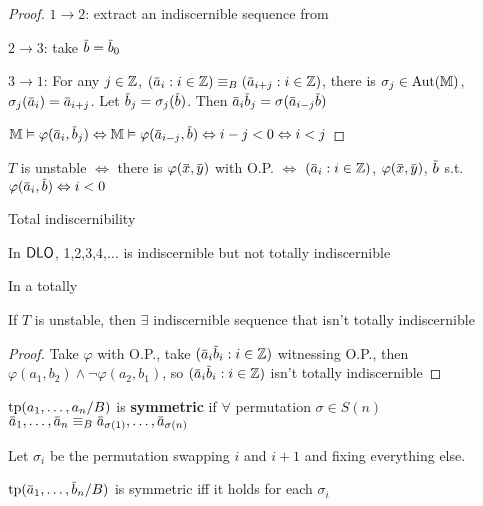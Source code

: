 \documentclass[11pt]{article}
\begin{document}
\begin{proof}
\(1\to 2\): extract an indiscernible sequence from

\(2\to 3\): take \(\barb=\barb_0\)

\(3\to 1\): For any \(j\in\mathbb{Z}\), \((\bara_i:i\in\Z)\equiv_B(\bara_{i+j}:i\in\Z)\), there
is \(\sigma_j\in\operatorname{\text{Aut}}(\mathbb{M})\), \(\sigma_j(\bara_i)=\bara_{i+j}\). Let \(\barb_j=\sigma_j(\barb)\).
Then \(\bara_i\barb_j=\sigma(\bara_{i-j}\barb)\)

\(\M\vDash\varphi(\bara_i,\barb_j)\Leftrightarrow\M\vDash\varphi(\bara_{i-j},\barb)\Leftrightarrow i-j<0\Leftrightarrow i<j\)
\end{proof}

\begin{corollary}[]
\(T\) is unstable \(\Leftrightarrow\) there is \(\varphi(\barx,\bary)\) with
O.P. \(\Leftrightarrow\) \((\bara_i:i\in\Z)\), \(\varphi(\barx,\bary)\), \(\barb\)
s.t. \(\varphi(\bara_i,\barb)\Leftrightarrow i<0\)
\end{corollary}

Total indiscernibility

\begin{examplle}[]
In \(\operatorname{\textsf{DLO}}\), 1,2,3,4,\(\dots\) is indiscernible but not totally indiscernible
\end{examplle}

In a totally

\begin{proposition}[]
If \(T\) is unstable, then \(\exists\) indiscernible sequence that isn't totally indiscernible
\end{proposition}

\begin{proof}
Take \(\varphi\) with O.P., take \((\bara_i\barb_i:i\in\Z)\) witnessing O.P., then \(\varphi(a_1,b_2)\wedge\neg\varphi(a_2,b_1)\),
so \((\bara_i\barb_i:i\in\Z)\) isn't totally indiscernible
\end{proof}

\begin{definition}[]
\(\operatorname{tp}(a_1,\dots,a_n/B)\) is \textbf{symmetric} if \(\forall\) permutation \(\sigma\in S(n)\)
\(\bara_1,\dots,\bara_n\equiv_B\bara_{\sigma(1)},\dots,\bara_{\sigma(n)}\)
\end{definition}

\begin{remark}
Let \(\sigma_i\) be the permutation swapping \(i\) and \(i+1\) and fixing everything else.

\(\tp(\bara_1,\dots,\barb_n/B)\) is symmetric iff it holds for each \(\sigma_i\)
\end{remark}
\end{document}
